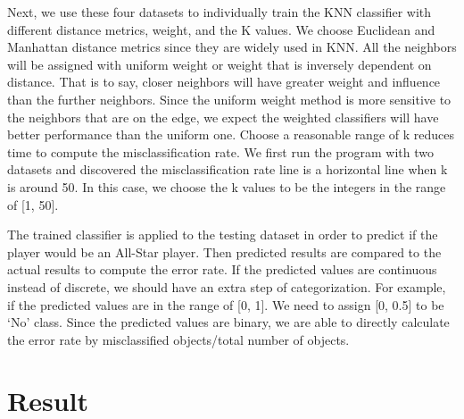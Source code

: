 \documentclass{article}
\begin{document}
Next, we use these four datasets to individually train the KNN classifier with different distance metrics, weight, and the K values. We choose Euclidean and Manhattan distance metrics since they are widely used in KNN. All the neighbors will be assigned with uniform weight or weight that is inversely dependent on distance. That is to say, closer neighbors will have greater weight and influence than the further neighbors. Since the uniform weight method is more sensitive to the neighbors that are on the edge, we expect the weighted classifiers will have better performance than the uniform one. Choose a reasonable range of k reduces time to compute the misclassification rate. We first run the program with two datasets and discovered the misclassification rate line is a horizontal line when k is around 50. In this case, we choose the k values to be the integers in the range of [1, 50]. 

The trained classifier is applied to the testing dataset in order to predict if the player would be an All-Star player. Then predicted results are compared to the actual results to compute the error rate. If the predicted values are continuous instead of discrete, we should have an extra step of categorization. For example, if the predicted values are in the range of [0, 1]. We need to assign [0, 0.5] to be ‘No’ class. Since the predicted values are binary, we are able to directly calculate the error rate by misclassified objects/total number of objects.


\section{Result}
\end{document}
